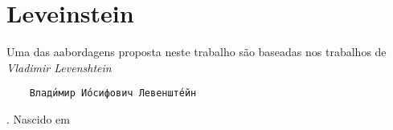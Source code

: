 \section{Leveinstein} %
\label{sec:leveinstein}

Uma das aabordagens proposta neste trabalho são baseadas nos trabalhos de \textit{Vladimir Levenshtein} 
\begin{verbatim}
	Влади́мир Ио́сифович Левенште́йн
\end{verbatim}. Nascido em 

